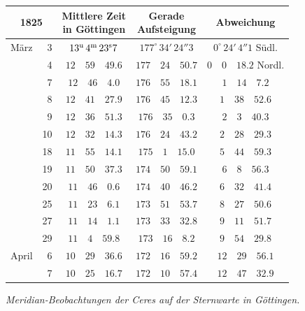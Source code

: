 \begin{center}
\begingroup\small\setlength{\tabcolsep}{4pt}
\begin{tabular}{lr|c|c|c}
\multicolumn{2}{c|}{1825} & \shortstack{Mittlere Zeit\\in Göttingen} & \shortstack{Gerade\\Aufsteigung} & Abweichung \\
\hline
März & 3 & $13^{\rm u}\,4^{\rm m}\,23^{\rm s}7$ & $177^{\circ}\,34'\,24''3$ & $0^{\circ}\,24'\,4''1$ Südl. \\
 & 4 & $12\quad59\quad49.6$ & $177\quad24\quad50.7$ & $0\quad0\quad18.2$ Nordl. \\
 & 7 & $12\quad46\quad4.0$ & $176\quad55\quad18.1$ & $1\quad14\quad7.2$ \\
 & 8 & $12\quad41\quad27.9$ & $176\quad45\quad12.3$ & $1\quad38\quad52.6$ \\
 & 9 & $12\quad36\quad51.3$ & $176\quad35\quad0.3$ & $2\quad3\quad40.3$ \\
 & 10 & $12\quad32\quad14.3$ & $176\quad24\quad43.2$ & $2\quad28\quad29.3$ \\
 & 18 & $11\quad55\quad14.1$ & $175\quad1\quad15.0$ & $5\quad44\quad59.3$ \\
 & 19 & $11\quad50\quad37.3$ & $174\quad50\quad59.1$ & $6\quad8\quad56.3$ \\
 & 20 & $11\quad46\quad0.6$ & $174\quad40\quad46.2$ & $6\quad32\quad41.4$ \\
 & 25 & $11\quad23\quad6.1$ & $173\quad51\quad53.7$ & $8\quad27\quad50.6$ \\
 & 27 & $11\quad14\quad1.1$ & $173\quad33\quad32.8$ & $9\quad11\quad51.7$ \\
 & 29 & $11\quad4\quad59.8$ & $173\quad16\quad8.2$ & $9\quad54\quad29.8$ \\
April & 6 & $10\quad29\quad36.6$ & $172\quad16\quad59.2$ & $12\quad29\quad56.1$ \\
 & 7 & $10\quad25\quad16.7$ & $172\quad10\quad57.4$ & $12\quad47\quad32.9$ \\
\end{tabular}
\endgroup
\end{center}

\begin{center}
\emph{Meridian-Beobachtungen der Ceres auf der Sternwarte in Göttingen.}
\end{center}

